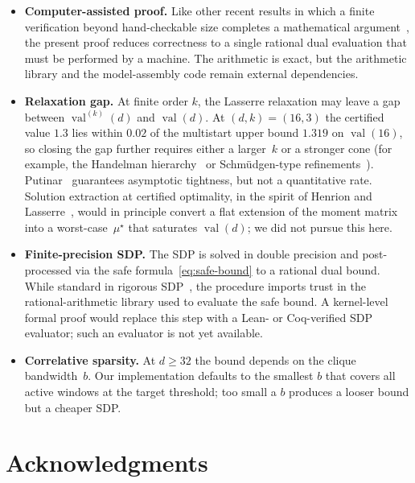 \documentclass[11pt, letterpaper]{article}
\theoremstyle{paperplain}
\theoremstyle{paperdef}
\newcommand{\val}{\operatorname{val}}
\begin{document}
\begin{itemize}
  \item \textbf{Computer-assisted proof.}
    Like other recent results in which a finite verification beyond
    hand-checkable size completes a mathematical
    argument~\cite{Hales2017,PlattTrudgian2021}, the present proof
    reduces correctness to a single rational dual evaluation that must
    be performed by a machine.  The arithmetic is exact, but the
    arithmetic library and the model-assembly code remain external
    dependencies.
  \item \textbf{Relaxation gap.}
    At finite order $k$, the Lasserre relaxation may leave a gap
    between $\val^{(k)}(d)$ and $\val(d)$.  At $(d,k)=(16,3)$ the
    certified value $1.3$ lies within $0.02$ of the multistart upper
    bound $1.319$ on $\val(16)$, so closing the gap further requires
    either a larger~$k$ or a stronger cone (for example, the
    Handelman hierarchy~\cite{Handelman1988} or
    Schm\"udgen-type refinements~\cite{Schmudgen1991}).
    Putinar~\cite{Putinar1993} guarantees asymptotic tightness, but
    not a quantitative rate.  Solution extraction at certified
    optimality, in the spirit of Henrion and
    Lasserre~\cite{HenrionLasserre2005}, would in principle convert a
    flat extension of the moment matrix into a worst-case~$\mu^\star$
    that saturates $\val(d)$; we did not pursue this here.
  \item \textbf{Finite-precision SDP.}
    The SDP is solved in double precision and post-processed via the
    safe formula~\eqref{eq:safe-bound} to a rational dual bound.
    While standard in rigorous SDP~\cite{JanssonChaykinKeil2008}, the
    procedure imports trust in the rational-arithmetic library used to
    evaluate the safe bound.  A kernel-level formal proof would
    replace this step with a Lean- or Coq-verified SDP evaluator;
    such an evaluator is not yet available.
  \item \textbf{Correlative sparsity.}
    At $d\ge 32$ the bound depends on the clique bandwidth~$b$.  Our
    implementation defaults to the smallest $b$ that covers all
    active windows at the target threshold; too small a $b$ produces
    a looser bound but a cheaper SDP.
\end{itemize}


\section*{Acknowledgments}
\end{document}
